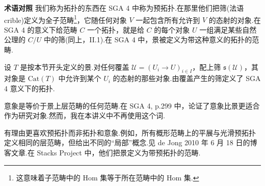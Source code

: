 \textbf{术语对照} 我们称为拓扑的东西在 SGA 4 中称为预拓扑.在那里他们把筛(法语 crible)定义为全子范畴\footnote{这意味着子范畴中的 Hom 集等于所在范畴中的 Hom 集.}，它随任何对象 $V$ 一起包含所有允许到 $V$ 的态射的对象.在 SGA 4 的意义下给范畴 $C$ 一个拓扑，就是给 $C$ 的每个对象 $U$ 一组满足某些自然公理的 $C/U$ 中的筛(同上，II.1).在 SGA 4 中，景被定义为带这种意义的拓扑的范畴.

设 $T$ 是按本节开头定义的景.对任何覆盖 $\mathcal{U} = (U_i \to U)_{i \in I}$，配上筛 $\mathfrak{s}(\mathcal{U})$，其对象是 $\mathrm{Cat}(T)$ 中允许到某个 $U_i$ 的态射的那些对象.由覆盖产生的筛定义了 SGA 4 意义下的拓扑.

意象是等价于景上层范畴的任何范畴.在 SGA 4, p.299 中，论证了意象比景更适合作为研究对象.然而，我在本讲义中不再使用这个词.

有理由更喜欢预拓扑而非拓扑和意象.例如，所有概形范畴上的平展与光滑预拓扑定义相同的层范畴，但给出不同的``局部''概念.见 de Jong 2010 年 6 月 18 日的博客文章.在 Stacks Project 中，他们把景定义为带预拓扑的范畴.
